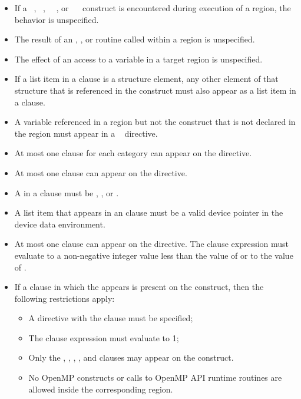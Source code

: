 \restrictions
\begin{itemize}
\item If a ~, ~, 
      ~~, or 
      ~~ construct is encountered during
      execution of a  region, the behavior is unspecified.
\item The result of an , , 
      or  routine called within a  region 
      is unspecified.
\item The effect of an access to a  variable in a target region 
      is unspecified.
\item If a list item in a  clause is a structure element, any other
      element of that structure that is referenced in the  construct
      must also appear as a list item in a  clause.
\item A variable referenced in a  region but not the  
      construct that is not declared in the  region must appear in 
      a ~ directive.
\item At most one  clause for each category can appear on the 
      directive.
\item At most one  clause can appear on the directive.
\item A  in a  clause must be , , 
       or .
\item A list item that appears in an  clause must be a valid 
      device pointer in the device data environment.
\item At most one  clause can appear on the directive. The  
      clause expression must evaluate to a non-negative integer value less than the 
      value of  or to the value of 
      .
\item If a  clause in which the   
      appears is present on the construct, then the following restrictions apply:

\begin{itemize}
\item A  directive with the  clause must 
      be specified;
\item The  clause expression must evaluate to 1;
\item Only the , , ,
      , and  clauses may appear on the construct.
\item No OpenMP constructs or calls to OpenMP API runtime routines are allowed
      inside the corresponding  region.
\end{itemize}


\end{itemize}
